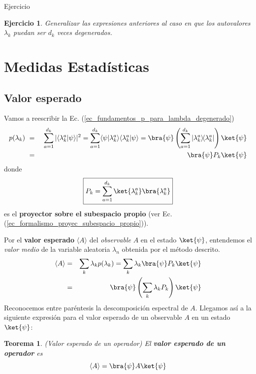 \documentclass[a4paper,11pt]{book} %
\newtheorem{teorema_contador}{Teorema}
\newcommand{\Teorema}[1]{
		\begin{mybox_gray2}{}
			\begin{teorema_contador}
				 #1 
			\end{teorema_contador} 
		\end{mybox_gray2}
	}
\newtheorem{ejercicio_contador}{Ejercicio}
\newcommand{\Ejercicio}[1]{
		\begin{mybox_gray}{Ejercicio} 
			\begin{ejercicio_contador}
				 #1 
			\end{ejercicio_contador} 
		\end{mybox_gray}
	}
\numberwithin{equation}{chapter}
\newcommand{\braket}[2]{\langle #1|#2\rangle}
\newcommand{\ketbra}[2]{| #1\rangle \! \langle #2|}
\begin{document}
	
	\Ejercicio{Generalizar las expresiones anteriores al caso en que los autovalores $\lambda_k$ puedan ser $d_k$ veces degenerados.
	}

	\section{Medidas Estadísticas}
	
		\subsection{Valor esperado}

Vamos a reescribir la Ec. (\ref{ec_fundamentos_p_para_lambda_degenerado})
\begin{eqnarray} \label{ec_fundamentos_p_para_lambda_degenerado_proyector}
p(\lambda_k)~ 
&=& ~ \sum_{a=1}^{d_k}|\braket{\lambda^a_k}{\psi}|^2 
 = \sum_{a=1}^{d_k} \braket{\psi}{\lambda^a_k}\braket{\lambda^a_k}{\psi}  
 =\bra{\psi}\left(\sum_{a=1}^{d_k}\ketbra{\lambda^a_k}{\lambda^a_k}\right) \ket{\psi}\nonumber\\
&=&  \bra{\psi}P_k\ket{\psi} 
\end{eqnarray}    
donde 
	\begin{equation}
	\boxed{P_k = \sum_{a=1}^{d_k} \ket{\lambda^a_k}\bra{\lambda^a_k}}
	\end{equation}
es el \textbf{proyector sobre el subespacio propio} (ver Ec. (\ref{ec_formalismo_proyec_subespacio_propio})).

Por el \textbf{valor esperado} $\langle A\rangle$ del \textit{observable} $A$ en el estado $\ket{\psi}$, entendemos el \textit{valor medio} de la variable aleatoria $\lambda_n$ obtenida por el método descrito. 
\begin{eqnarray}
\langle A\rangle 
	&= &  \sum_k \lambda_k p(\lambda_k)
     =  \sum_k \lambda_k \bra{\psi}P_k\ket{\psi}  \nonumber \\
	&=& \bra{\psi}\left(\sum_k \lambda_k P_k  \right) \ket{\psi} 
\end{eqnarray}
Reconocemos entre paréntesis la descomposición espectral de $A$. Llegamos así a la siguiente expresión para el valor esperado de un observable $A$ en un estado $\ket{\psi}$:
	
	\Teorema{(\textit{Valor esperado de un operador})
	El \textbf{valor esperado de un operador} es
		\begin{equation}
		\langle A \rangle=\bra{\psi}A \ket{\psi}
		\end{equation}
	}
\end{document}
